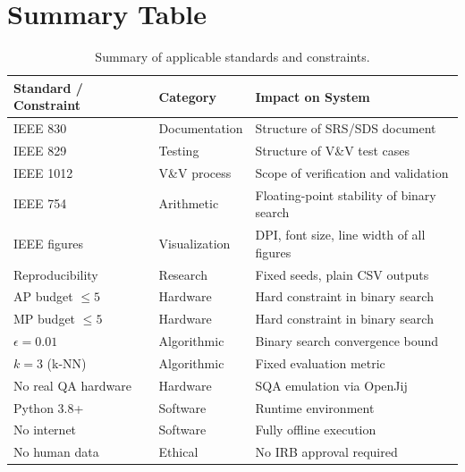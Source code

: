 \documentclass[12pt,a4paper]{article}
\begin{document}
\section{Summary Table}

\begin{table}[h!]
\centering
\renewcommand{\arraystretch}{1.3}
\begin{tabular}{@{}lp{4.5cm}p{6cm}@{}}
\toprule
\textbf{Standard / Constraint} & \textbf{Category} & \textbf{Impact on System} \\
\midrule
IEEE 830   & Documentation    & Structure of SRS/SDS document \\
IEEE 829   & Testing          & Structure of V\&V test cases \\
IEEE 1012  & V\&V process     & Scope of verification and validation \\
IEEE 754   & Arithmetic       & Floating-point stability of binary search \\
IEEE figures & Visualization  & DPI, font size, line width of all figures \\
Reproducibility & Research    & Fixed seeds, plain CSV outputs \\
AP budget $\leq 5$ & Hardware & Hard constraint in binary search \\
MP budget $\leq 5$ & Hardware & Hard constraint in binary search \\
$\epsilon = 0.01$ & Algorithmic & Binary search convergence bound \\
$k = 3$ (k-NN) & Algorithmic  & Fixed evaluation metric \\
No real QA hardware & Hardware & SQA emulation via OpenJij \\
Python 3.8+ & Software        & Runtime environment \\
No internet & Software        & Fully offline execution \\
No human data & Ethical       & No IRB approval required \\
\bottomrule
\end{tabular}
\caption{Summary of applicable standards and constraints.}
\end{table}
\end{document}
